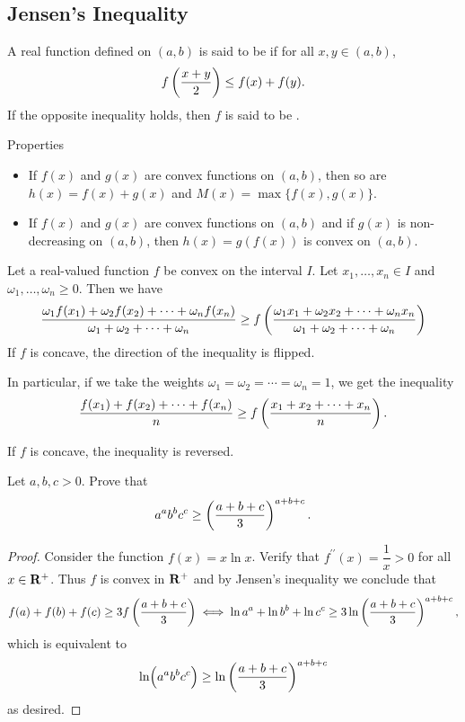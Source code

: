 \subsection{Jensen's Inequality}
A real function defined on $(a,b)$ is said to be  if for all $x,y\in(a,b)$,
\[ f\left(\frac{x+y}{2}\right)\le f(x)+f(y). \]
If the opposite inequality holds, then $f$ is said to be .

Properties
\begin{itemize}
\item If $f(x)$ and $g(x)$ are convex functions on $(a,b)$, then so are $h(x)=f(x)+g(x)$ and $M(x)=\max\{f(x),g(x)\}$.
\item If $f(x)$ and $g(x)$ are convex functions on $(a,b)$ and if $g(x)$ is non-decreasing on $(a,b)$, then $h(x)=g(f(x))$ is convex on $(a,b)$.
\end{itemize}

\begin{theorem}
Let a real-valued function $f$ be convex on the interval $I$. Let $x_1, \dots, x_n \in I$ and $\omega_1, \dots, \omega_n \ge 0$. Then we have 
\begin{equation}
\frac{\omega_1f(x_1)+\omega_2f(x_2)+\cdots+\omega_nf(x_n)}{\omega_1+\omega_2+\cdots+\omega_n} \ge f\left(\frac{\omega_1x_1+\omega_2x_2+\cdots+\omega_nx_n}{\omega_1+\omega_2+\cdots+\omega_n}\right)
\end{equation}
If $f$ is concave, the direction of the inequality is flipped.

In particular, if we take the weights $\omega_1=\omega_2=\cdots=\omega_n=1$, we get the inequality
\[ \frac{f(x_1)+f(x_2)+\cdots+f(x_n)}{n} \ge f\left(\frac{x_1+x_2+\cdots+x_n}{n}\right). \]
\end{theorem}

If $f$ is concave, the inequality is reversed.

\begin{exercise}
Let $a,b,c>0$. Prove that
\[ a^ab^bc^c\ge\left(\frac{a+b+c}{3}\right)^{a+b+c}. \]
\end{exercise}

\begin{proof}
Consider the function $f(x)=x\ln x$. Verify that $f^{\prime\prime}(x)=\dfrac{1}{x}>0$ for all $x\in\mathbf R^+$. Thus $f$ is convex in $\mathbf R^+$ and by Jensen's inequality we conclude that
\[ f(a)+f(b)+f(c)\ge3f\left(\frac{a+b+c}{3}\right) \iff \ln a^a+\ln b^b+\ln c^c\ge3\ln\left(\frac{a+b+c}{3}\right)^{a+b+c}, \]
which is equivalent to
\[ \ln(a^ab^bc^c)\ge\ln\left(\frac{a+b+c}{3}\right)^{a+b+c} \]
as desired.
\end{proof}

